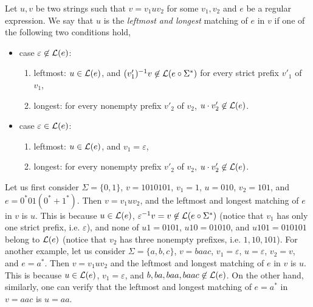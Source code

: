 \begin{definition}
Let $u, v$ be two strings such that $v = v_1 u v_2$ for some $v_1,v_2$ and $e$ be a regular expression. We say that $u$ is the \emph{leftmost and longest} matching of $e$ in $v$ if one of the following two conditions hold,
\begin{itemize}
\item case $\varepsilon \not \in \mathcal{L}(e)$:
\begin{enumerate}
	\item leftmost: $u \in \mathcal{L}(e)$,  and $(v'_1)^{-1} v \not \in  \mathcal{L}(e \circ \Sigma^*)$ for every strict prefix $v'_1$ of $v_1$, 
	\item longest: for every nonempty prefix $v'_2$ of $v_2$, $u \cdot v'_2 \not \in \mathcal{L}(e)$.
\end{enumerate} 
%
\item case $\varepsilon \in \mathcal{L}(e)$:
\begin{enumerate}
	\item leftmost: $u \in \mathcal{L}(e)$, and $v_1 = \varepsilon$, 
	\item longest: for every nonempty prefix $v'_2$ of $v_2$, $u \cdot v'_2 \not \in \mathcal{L}(e)$.
\end{enumerate} 
\end{itemize}
\end{definition}


\begin{example}
Let us first consider $\Sigma = \{0,1\}$, $v=1010101$, $v_1 =1$, $u = 010$, $v_2 = 101$, and $e = 0^*01(0^*+ 1^*)$. Then $v= v_1 u v_2$, and the leftmost and longest matching of $e$ in $v$ is $u$. This is because $u \in \mathcal{L}(e)$, $\varepsilon^{-1} v = v \not \in \mathcal{L}(e \circ \Sigma^*)$ (notice that $v_1$ has only one strict prefix, i.e. $\varepsilon$), and none of $u 1=0101$, $u 10=01010$, and $u101=010101$ belong to $\mathcal{L}(e)$ (notice that $v_2$ has three nonempty prefixes, i.e. $1,10,101$). For another example, let us consider $\Sigma = \{a,b,c\}$, $v=baac$, $v_1 = \varepsilon$, $u =\varepsilon$, $v_2 = v$, and $e = a^*$. Then $v = v_1 u v_2$ and  the leftmost and longest matching of $e$ in $v$ is $u$. This is because $u \in \mathcal{L}(e)$, $v_1 = \varepsilon$, and $b, ba, baa, baac \not \in \mathcal{L}(e)$. On the other hand, similarly, one can verify that the leftmost and longest matching of $e=a^*$ in $v=aac$ is $u=aa$.
\end{example}


